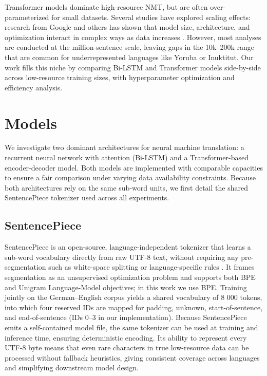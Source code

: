 \documentclass{article}
\begin{document}
 Transformer models dominate high-resource NMT, but are often over-parameterized for small datasets. Several studies have explored scaling effects: research from Google and others has shown that model size, architecture, and optimization interact in complex ways as data increases \citep{hoffmann2022trainingcomputeoptimallargelanguage}. However, most analyses are conducted at the million-sentence scale, leaving gaps in the 10k–200k range that are common for underrepresented languages like Yoruba or Inuktitut. Our work fills this niche by comparing Bi-LSTM and Transformer models side-by-side across low-resource training sizes, with hyperparameter optimization and efficiency analysis.


\section{Models}
\label{sec:models}
We investigate two dominant architectures for neural machine translation: a recurrent neural network with attention (Bi-LSTM) and a Transformer-based encoder-decoder model. Both models are implemented with comparable capacities to ensure a fair comparison under varying data availability constraints. Because both architectures rely on the same sub-word units, we first detail the shared SentencePiece tokenizer used across all experiments.

\subsection{SentencePiece}
\label{subsec:SentencePiece}
SentencePiece is an open-source, language-independent tokenizer that learns a sub-word vocabulary directly from raw UTF-8 text, without requiring any pre-segmentation such as white-space splitting or language-specific rules \citep{kudo2018sentencepiecesimplelanguageindependent}. It frames segmentation as an unsupervised optimization problem and supports both BPE and Unigram Language-Model objectives; in this work we use BPE. Training jointly on the German–English corpus yields a shared vocabulary of 8 000 tokens, into which four reserved IDs are mapped for padding, unknown, start-of-sentence, and end-of-sentence (IDs 0–3 in our implementation). Because SentencePiece emits a self-contained model file, the same tokenizer can be used at training and inference time, ensuring deterministic encoding. Its ability to represent every UTF-8 byte means that even rare characters in true low-resource data can be processed without fallback heuristics, giving consistent coverage across languages and simplifying downstream model design.
\end{document}
